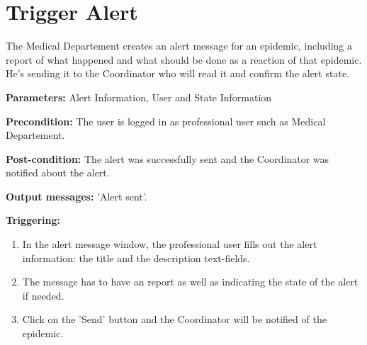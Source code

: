 \section{Trigger Alert}
\label{operation:TriggerAlert}
The Medical Departement creates an alert message for an epidemic, including a
report of what happened and what should be done as a reaction of that epidemic.
He's sending it to the Coordinator who will read it and confirm the alert
state.\\
\begin{description}
\item \textbf{Parameters:} Alert Information, User and State Information
\item \textbf{Precondition:} The user is logged in as professional user such as
Medical Departement.
\item \textbf{Post-condition:}  The alert was successfully sent and the
Coordinator was notified about the alert.
\item \textbf{Output messages:} 'Alert sent'.
\item \textbf{Triggering:}
\begin{enumerate}
\item In the alert message window, the professional user fills out
the alert information: the title and the description text-fields.
\item The message has to have an report as well as indicating the state of the
alert if needed.
\item Click on the 'Send' button and the Coordinator will be notified of the
epidemic.
\end{enumerate}
\end{description}

